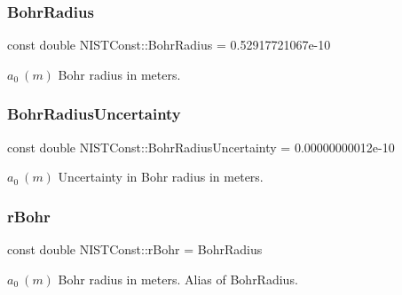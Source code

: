 \subsubsection{\texorpdfstring{Bohr\+Radius}{BohrRadius}}
{\footnotesize\ttfamily const double N\+I\+S\+T\+Const\+::\+Bohr\+Radius = 0.\+52917721067e-\/10}

$a_0 \ (m)$ Bohr radius in meters. \mbox{\label{group___bohr_radius_gad031da8c7a2e239441e06c10fd8f6f07}} 
\subsubsection{\texorpdfstring{Bohr\+Radius\+Uncertainty}{BohrRadiusUncertainty}}
{\footnotesize\ttfamily const double N\+I\+S\+T\+Const\+::\+Bohr\+Radius\+Uncertainty = 0.\+00000000012e-\/10}

$a_0 \ (m)$ Uncertainty in Bohr radius in meters. \mbox{\label{group___bohr_radius_gad2a74a106c13086263e42411835b6352}} 
\subsubsection{\texorpdfstring{r\+Bohr}{rBohr}}
{\footnotesize\ttfamily const double N\+I\+S\+T\+Const\+::r\+Bohr = Bohr\+Radius}

$a_0 \ (m)$ Bohr radius in meters. Alias of Bohr\+Radius. 